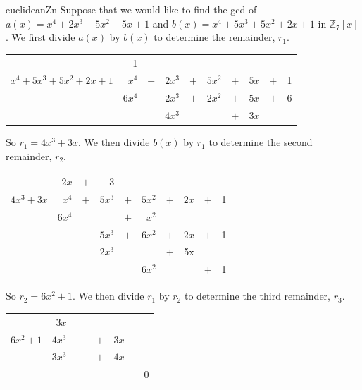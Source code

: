 \begin{example}{euclideanZn} 
Suppose that we would like to find the gcd of $a(x) = x^4 + 2x^3 + 5x^2 +5x + 1$ and $b(x) = x^4 + 5x^3 + 5x^2 + 2x +1$ in $\mathbb{Z}_7[x]$.  We first divide $a(x)$ by $b(x)$ to determine the remainder, $r_1$.

\begin{center}
\begin{tabular}{rrcrcrcrcr}
        &  1         &        &                 &           &             &         &         &        &   \\ \cline{2-10}
 \multicolumn{1}{r|}{$x^4 + 5x^3 + 5x^2 +2x +1$}
        &  $x^4$  &  $+$  &    $2x^3$   &  $+$   & $5x^2$  &  $+$  &  $5x$ & $+$  & 1 \\
        &  $6x^4$ &  $+$  &  $2x^3$     &   $+$   & $2x^2$  &  $+$  &  $5x$ & $+$ & 6 \\ \cline{2-10}
        &             &        &  $4x^3$  &          &              &  $+$  & $3x$&       &    \\
 \end{tabular}
\end{center}


So $r_1 = 4x^3+3x$. We then divide $b(x)$ by $r_1$ to determine the second remainder, $r_2$.

\begin{center}
\begin{tabular}{rrcrcrcrcr}
        &  $2x$         &   $+$     &       3          &           &             &         &         &        &   \\ \cline{2-10}
 \multicolumn{1}{r|}{$4x^3+3x$}
        &  $x^4$  &  $+$  &    $5x^3$   &  $+$   & $5x^2$  &  $+$  &  $2x$ & $+$  & 1 \\
        &  $6x^4$ &         &                    &   $+$   & $x^2$  &            &           &         &     \\ \cline{2-10}
        &             &        &  $5x^3$  &   $+$       &      $6x^2$        &  $+$  & $2x$&    $+$   &  1  \\
&&&$2x^3$&&&$+$&5x&& \\ \cline{4-10}
&&&&&$6x^2$&&&$+$&1 \\
 \end{tabular}
\end{center}

So $r_2 =6x^2+1$. We then divide $r_1$ by $r_2$ to determine the third remainder, $r_3$.

\begin{center}
\begin{tabular}{rrcrcrcr}
        &  $3x$         &           &           &             &         &  &         \\ \cline{2-8}
 \multicolumn{1}{r|}{$6x^2+1$}
        &    $4x^3$   &        &   &  $+$  &  $3x$ &   &  \\
        &  $3x^3$ &          &                    &  $+$   & $4x$    &         &             \\ \cline{2-8}
        &                  &    & &    &  &    &  0  \\
 \end{tabular}
\end{center}


\end{example}
